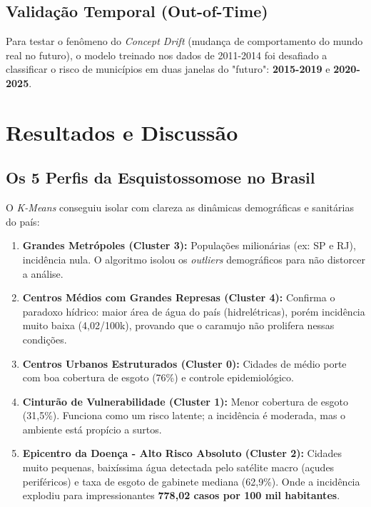 \documentclass[12pt,a4paper]{article}
\begin{document}
\subsection{Validação Temporal (Out-of-Time)}
Para testar o fenômeno do \textit{Concept Drift} (mudança de comportamento do mundo real no futuro), o modelo treinado nos dados de 2011-2014 foi desafiado a classificar o risco de municípios em duas janelas do "futuro": \textbf{2015-2019} e \textbf{2020-2025}.

\section{Resultados e Discussão}

\subsection{Os 5 Perfis da Esquistossomose no Brasil}
O \textit{K-Means} conseguiu isolar com clareza as dinâmicas demográficas e sanitárias do país:

\begin{enumerate}
    \item \textbf{Grandes Metrópoles (Cluster 3):} Populações milionárias (ex: SP e RJ), incidência nula. O algoritmo isolou os \textit{outliers} demográficos para não distorcer a análise.
    \item \textbf{Centros Médios com Grandes Represas (Cluster 4):} Confirma o paradoxo hídrico: maior área de água do país (hidrelétricas), porém incidência muito baixa (4,02/100k), provando que o caramujo não prolifera nessas condições.
    \item \textbf{Centros Urbanos Estruturados (Cluster 0):} Cidades de médio porte com boa cobertura de esgoto (76\%) e controle epidemiológico.
    \item \textbf{Cinturão de Vulnerabilidade (Cluster 1):} Menor cobertura de esgoto (31,5\%). Funciona como um risco latente; a incidência é moderada, mas o ambiente está propício a surtos.
    \item \textbf{Epicentro da Doença - Alto Risco Absoluto (Cluster 2):} Cidades muito pequenas, baixíssima água detectada pelo satélite macro (açudes periféricos) e taxa de esgoto de gabinete mediana (62,9\%). Onde a incidência explodiu para impressionantes \textbf{778,02 casos por 100 mil habitantes}.
\end{enumerate}
\end{document}
